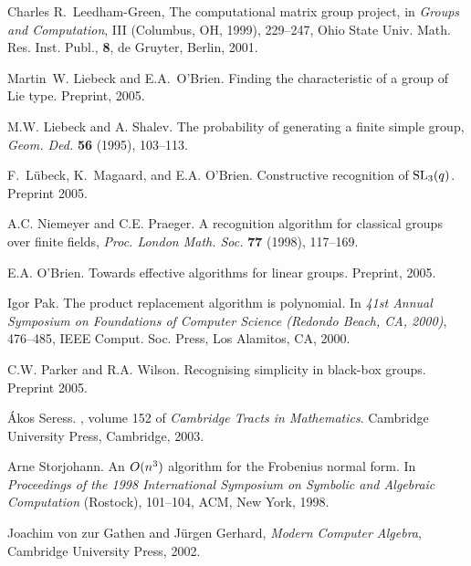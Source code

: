 \documentclass[12pt]{article}
\def\SL{{\rm SL}}
\begin{document}
\begin{thebibliography}{10000}
Charles R.\ Leedham-Green,
The computational matrix group project, in
{\it Groups and Computation}, III (Columbus, OH, 1999), 229--247, Ohio
State Univ. Math. Res. Inst. Publ., {\bf 8}, de Gruyter, Berlin, 2001.
                                                                                
Martin~W. Liebeck and E.A.\ O'Brien.
\newblock Finding the characteristic of a group of Lie type.
\newblock Preprint, 2005.

 M.W. Liebeck and A. Shalev. The probability of generating
a finite simple group, {\it Geom. Ded.} {\bf 56} (1995), 103--113.

F.\ L{\"u}beck, K.\ Magaard, and E.A. O'Brien. 
Constructive recognition of $\SL_3(q)$.
Preprint 2005.


                                                                                
 A.C. Niemeyer and C.E. Praeger.
A recognition algorithm for classical groups over finite fields,
{\it Proc. London Math. Soc.} {\bf 77} (1998), 117--169.

E.A. O'Brien. Towards effective algorithms for linear groups.
Preprint, 2005.


Igor Pak. The product replacement algorithm is polynomial.
In {\it 41st Annual Symposium on Foundations of Computer Science
(Redondo Beach, CA, 2000)}, 476--485,
IEEE Comput. Soc. Press, Los Alamitos, CA, 2000.

C.W. Parker and R.A. Wilson.
Recognising simplicity in black-box groups. 
Preprint 2005.

{\'A}kos Seress.
, volume 152 of {\em Cambridge
  Tracts in Mathematics}.
\newblock Cambridge University Press, Cambridge, 2003.

Arne Storjohann.
An $O(n\sp 3)$ algorithm for the Frobenius normal form. In
{\em Proceedings of the 1998 International Symposium on Symbolic
and Algebraic Computation} (Rostock), 101--104, ACM, New York, 1998.


Joachim von zur Gathen and J\"urgen Gerhard,
{\it Modern Computer Algebra}, Cambridge University Press, 2002.
\end{thebibliography}
\end{document}
